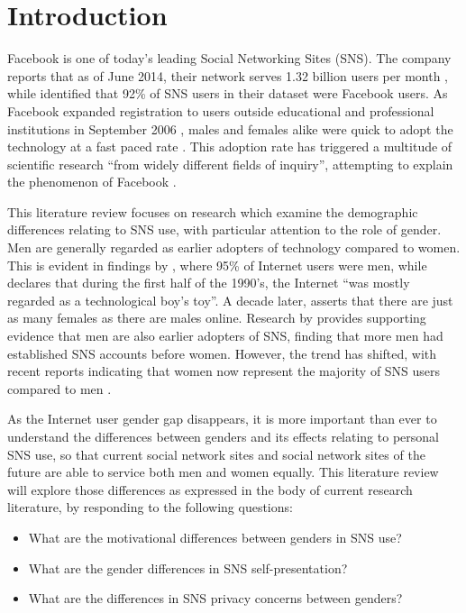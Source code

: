 \section{Introduction}

Facebook is one of today's leading Social Networking Sites (SNS). The company reports that as of June 2014, their network serves 1.32 billion users per month \citep{Facebook2014}, while \citet{Hampton2011} identified that 92\% of SNS users in their dataset were Facebook users. As Facebook expanded registration to users outside educational and professional institutions in September 2006 \citep{Facebook2014}, males and females alike were quick to adopt the technology at a fast paced rate \citep{Mazman2011}. This adoption rate has triggered a multitude of scientific research ``from widely different fields of inquiry'', attempting to explain the phenomenon of Facebook \citep[p. 983]{Caers2013}. 

This literature review focuses on research which examine the demographic differences relating to SNS use, with particular attention to the role of gender. Men are generally regarded as earlier adopters of technology compared to women. This is evident in findings by \citet{Pitkow1994}, where 95\% of Internet users were men, while \citet[p. 896]{Kimbrough2013} declares that during the first half of the 1990's, the Internet ``was mostly regarded as a technological boy's toy''. A decade later, \citet{Fallows2005} asserts that there are just as many females as there are males online. Research by \citet{Fogel2009} provides supporting evidence that men are also earlier adopters of SNS, finding that more men had established SNS accounts before women. However, the trend has shifted, with recent reports indicating that women now represent the majority of SNS users compared to men \citep{Duggan2013, Hampton2011}.

As the Internet user gender gap disappears, it is more important than ever to understand the differences between genders and its effects relating to personal SNS use, so that current social network sites and social network sites of the future are able to service both men and women equally. This literature review will explore those differences as expressed in the body of current research literature, by responding to the following questions:
\begin{itemize}
\item What are the motivational differences between genders in SNS use?
\item What are the gender differences in SNS self-presentation?
\item What are the differences in SNS privacy concerns between genders?
\end{itemize}